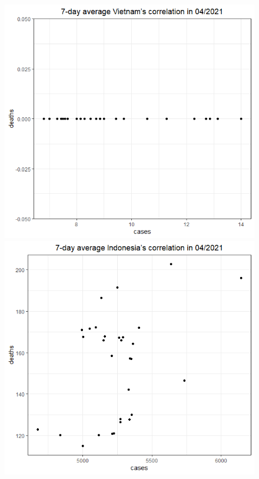 \documentclass[a4paper]{article}
\theoremstyle{definition}
\begin{document}
\begin{enumerate}[1)]
\begin{figure}[H]
\begin{center}
        \includegraphics[scale = 0.3]{ix/ix.3/VN_04_2021.png}
        \includegraphics[scale = 0.3]{ix/ix.3/IDN_04_2021.png}

\end{center}
\end{figure}
\end{enumerate}
\end{document}
